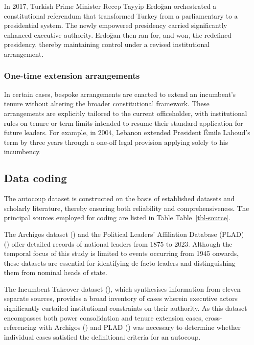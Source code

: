 \documentclass[
  12pt,
]{report}
\begin{document}
In 2017, Turkish Prime Minister Recep Tayyip Erdoğan orchestrated a
constitutional referendum that transformed Turkey from a parliamentary
to a presidential system. The newly empowered presidency carried
significantly enhanced executive authority. Erdoğan then ran for, and
won, the redefined presidency, thereby maintaining control under a
revised institutional arrangement.

\subsubsection*{One-time extension
arrangements}\label{one-time-extension-arrangements}

In certain cases, bespoke arrangements are enacted to extend an
incumbent's tenure without altering the broader constitutional
framework. These arrangements are explicitly tailored to the current
officeholder, with institutional rules on tenure or term limits intended
to resume their standard application for future leaders. For example, in
2004, Lebanon extended President Émile Lahoud's term by three years
through a one-off legal provision applying solely to his incumbency.

\subsection*{Data coding}\label{data-coding}

The autocoup dataset is constructed on the basis of established datasets
and scholarly literature, thereby ensuring both reliability and
comprehensiveness. The principal sources employed for coding are listed
in Table Table~\ref{tbl-source}.

The Archigos dataset () and the Political Leaders' Affiliation Database (PLAD)
() offer
detailed records of national leaders from 1875 to 2023. Although the
temporal focus of this study is limited to events occurring from 1945
onwards, these datasets are essential for identifying de facto leaders
and distinguishing them from nominal heads of state.

The Incumbent Takeover dataset (), which synthesises information from eleven separate
sources, provides a broad inventory of cases wherein executive actors
significantly curtailed institutional constraints on their authority. As
this dataset encompasses both power consolidation and tenure extension
cases, cross-referencing with Archigos
() and
PLAD () was
necessary to determine whether individual cases satisfied the
definitional criteria for an autocoup.
\end{document}
